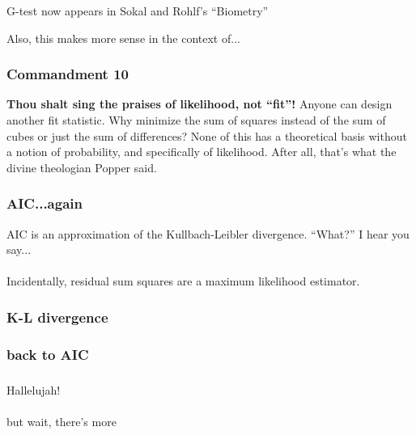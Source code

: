 \documentclass{beamer}
\begin{document}
  
  
  \begin{frame}
    \frametitle{}
    G-test now appears in Sokal and Rohlf's ``Biometry''
    
    Also, this makes more sense in the context of...
  \end{frame}



  \begin{frame}
    \frametitle{Commandment 10}
    \textbf{Thou shalt sing the praises of likelihood, not ``fit''!} 
    Anyone can design another fit statistic. 
    Why minimize the sum of squares instead of the sum of cubes or just the sum of differences? 
    None of this has a theoretical basis without a notion of probability, and specifically of likelihood. 
    After all, that's what the divine theologian Popper said.
  \end{frame}
  
  
  
  \begin{frame}
    \frametitle{}
  \end{frame}
  
  
  
  \begin{frame}
    \frametitle{AIC...again}
    AIC is an approximation of the Kullbach-Leibler divergence.
    ``What?'' I hear you say...
    \\~\\
    \small{Incidentally, residual sum squares are a maximum likelihood estimator.}
  \end{frame}
  
  
  
  \begin{frame}
    \frametitle{K-L divergence}
  
  \end{frame}



  \begin{frame}
    \frametitle{back to AIC}
  
  \end{frame}



  \begin{frame}
    \frametitle{}
    \huge{Hallelujah!}
    \\~\\
    \small{but wait, there's more\!}
  \end{frame}
  
\end{document}
